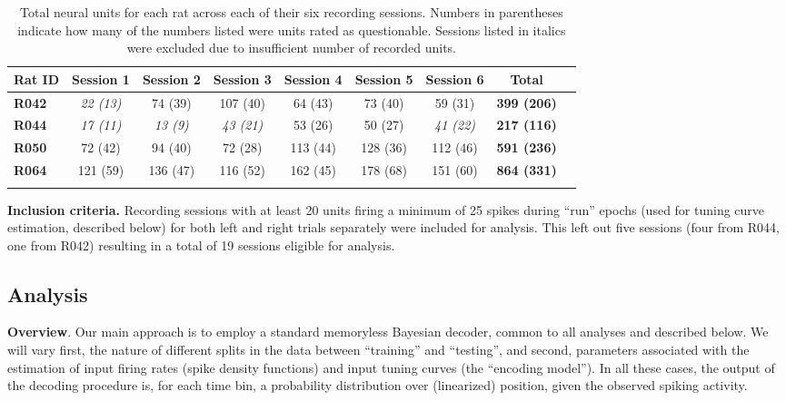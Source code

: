 \documentclass[11pt]{article}
\begin{document}
\begin{table}[h]
\centering
\small
  \begin{tabular}{ l c c c c c c c c}
    \hline
    \textbf{Rat ID} & \textbf{Session 1}    &   \textbf{Session 2}    & \textbf{Session 3} & \textbf{Session 4}  & \textbf{Session 5}  & \textbf{Session 6} & \textbf{Total} \\
    \hline
    \textbf{R042}    &     \it{22 (13)}   &   74 (39)  &  107 (40)  &   64 (43)  &   73 (40)  &   59 (31)  &\textbf{399 (206)}\\ 
    \textbf{R044}    &     \it{17 (11)}   &  \it{13 (9)}  &  \it{43 (21)}  &   53 (26)  &   50 (27)  &   \it{41 (22)}  &\textbf{217 (116)}\\ 
    \textbf{R050}    &     72 (42)   &   94 (40)  &  72 (28)  &   113 (44)  &   128 (36)  &   112 (46)  &\textbf{591 (236)}\\ 
    \textbf{R064}    &     121 (59)   &   136 (47)  &  116 (52)  &   162 (45)  &   178 (68)  &   151 (60)  &\textbf{864 (331)}\\ 
    \hline
    & & & & & & & &\\ %
  \end{tabular}
  \caption{Total neural units for each rat across each of their six
   recording sessions. Numbers in parentheses indicate how many of the
   numbers listed were units rated as questionable. Sessions listed in
   italics were excluded due to insufficient number of recorded units.}
\label{tab:nUnits}
\end{table}

{\bf Inclusion criteria.} Recording sessions with at least 20 units
firing a minimum of 25 spikes during ``run'' epochs (used for tuning
curve estimation, described below) for both left and right trials
separately were included for analysis. This left out five sessions
(four from R044, one from R042) resulting in a total of 19 sessions
eligible for analysis.

\subsection*{Analysis}

{\bf Overview}. Our main approach is to employ a standard memoryless
Bayesian decoder, common to all analyses and described below. We will
vary first, the nature of different splits in the data between
``training'' and ``testing'', and second, parameters associated with
the estimation of input firing rates (spike density functions) and
input tuning curves (the ``encoding model''). In all these cases, the
output of the decoding procedure is, for each time bin, a probability
distribution over (linearized) position, given the observed spiking
activity.
\end{document}
